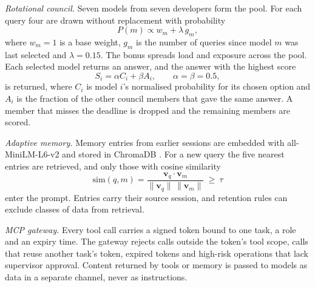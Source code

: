 \textit{Rotational council.} Seven models from seven developers form the pool. For each query four are drawn without replacement with probability
\begin{equation}
P(m) \propto w_m + \lambda\, g_m ,
\label{eq:rot}
\end{equation}
where $w_m=1$ is a base weight, $g_m$ is the number of queries since model $m$ was last selected and $\lambda=0.15$. The bonus spreads load and exposure across the pool. Each selected model returns an answer, and the answer with the highest score
\begin{equation}
S_i = \alpha C_i + \beta A_i ,\qquad \alpha=\beta=0.5,
\label{eq:score}
\end{equation}
is returned, where $C_i$ is model $i$'s normalised probability for its chosen option and $A_i$ is the fraction of the other council members that gave the same answer. A member that misses the deadline is dropped and the remaining members are scored.

\textit{Adaptive memory.} Memory entries from earlier sessions are embedded with all-MiniLM-L6-v2 and stored in ChromaDB \cite{chroma}. For a new query the five nearest entries are retrieved, and only those with cosine similarity
\begin{equation}
\mathrm{sim}(q,m)=\frac{\mathbf{v}_q\cdot\mathbf{v}_m}{\lVert\mathbf{v}_q\rVert\,\lVert\mathbf{v}_m\rVert}\ \geq\ \tau
\label{eq:sim}
\end{equation}
enter the prompt. Entries carry their source session, and retention rules can exclude classes of data from retrieval.

\textit{MCP gateway.} Every tool call carries a signed token bound to one task, a role and an expiry time. The gateway rejects calls outside the token's tool scope, calls that reuse another task's token, expired tokens and high-risk operations that lack supervisor approval. Content returned by tools or memory is passed to models as data in a separate channel, never as instructions.
